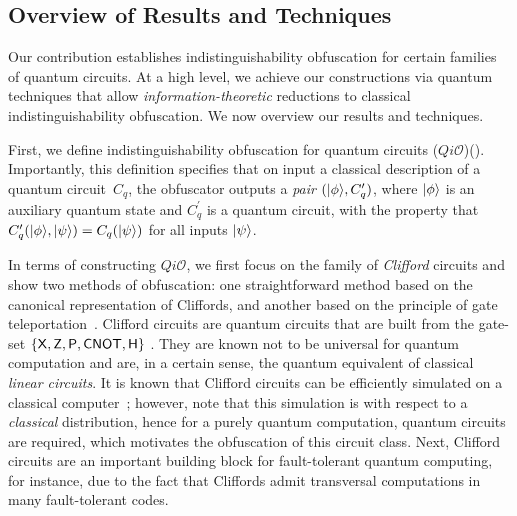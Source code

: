 \subsection{Overview of Results and Techniques}
\label{sec:techniques}

Our contribution establishes indistinguishability obfuscation for certain families of quantum circuits.  At a high level, we achieve our constructions via quantum techniques that allow \emph{information-theoretic} reductions to classical indistinguishability obfuscation. We now overview our results and techniques.


First, we define indistinguishability obfuscation for quantum circuits ($Qi\mathcal{O}$)(). Importantly, this definition specifies that on input a classical description of a quantum circuit~$C_q$, the obfuscator outputs a \emph{pair} $({\lvert}\phi\rangle, C_q^\prime)$, where ${\lvert}\phi\rangle$ is an auxiliary quantum state and $C_q^\prime$ is a quantum circuit, with the property that
$C_q^\prime({\lvert}\phi\rangle,{\lvert}\psi\rangle)=C_{q}({\lvert}\psi\rangle)$ for all inputs ${\lvert}\psi\rangle$.

In terms of constructing $Qi\mathcal{O}$, we first focus on the family of \emph{Clifford} circuits and show two methods of obfuscation: one straightforward method based on the canonical representation of Cliffords, and another based on the
principle of gate teleportation~\cite{GC99}.
Clifford circuits are quantum circuits that are built from the gate-set $\{{\sf X}, {\sf Z}, {\sf P}, {\sf CNOT}, {\sf H}\}$ . They are known not to be universal for quantum computation and  are, in a certain sense, the quantum equivalent of classical \emph{linear circuits}. It is known that Clifford circuits can be efficiently simulated on a classical computer~\cite{Got98}; however, note that  this simulation is with respect to a \emph{classical} distribution, hence for a purely quantum computation, quantum circuits are required, which motivates the obfuscation of this circuit class. Next,  Clifford circuits are an important building block for fault-tolerant quantum computing, for instance, due to the fact that Cliffords admit transversal computations in many fault-tolerant codes.


